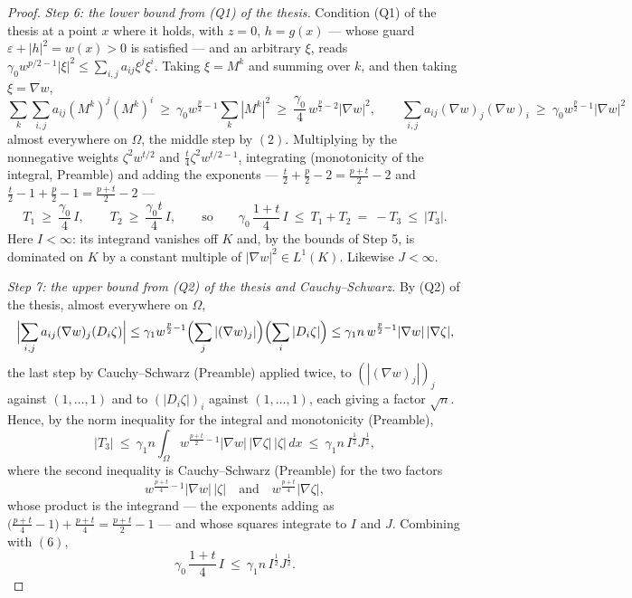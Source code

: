 \begin{proof}
\emph{Step 6: the lower bound from (Q1) of the thesis.}  Condition (Q1) of the thesis at a
point $x$ where it holds, with $z=0$, $h=g(x)$ --- whose guard
$\varepsilon+|h|^2=w(x)>0$ is satisfied --- and an arbitrary $\xi$, reads
$\gamma_0w^{p/2-1}|\xi|^2\le\sum_{i,j}a_{ij}\xi^j\xi^i$.  Taking $\xi=M^k$ and
summing over $k$, and then taking $\xi=\nabla w$,
\[
\sum_k\sum_{i,j}a_{ij}(M^k)^j(M^k)^i\ \ge\ \gamma_0w^{\frac p2-1}\sum_k|M^k|^2
\ \ge\ \frac{\gamma_0}4\,w^{\frac p2-2}|\nabla w|^2 ,
\qquad
\sum_{i,j}a_{ij}(\nabla w)_j(\nabla w)_i\ \ge\ \gamma_0w^{\frac p2-1}|\nabla w|^2
\]
almost everywhere on $\Omega$, the middle step by $(2)$.  Multiplying by the
nonnegative weights $\zeta^2w^{t/2}$ and $\tfrac t4\zeta^2w^{t/2-1}$,
integrating (monotonicity of the integral, Preamble) and adding the exponents
--- $\tfrac t2+\tfrac p2-2=\tfrac{p+t}2-2$ and
$\tfrac t2-1+\tfrac p2-1=\tfrac{p+t}2-2$ ---
\[
T_1\ \ge\ \frac{\gamma_0}4\,I,
\qquad
T_2\ \ge\ \frac{\gamma_0t}4\,I,
\qquad\text{so}\qquad
\gamma_0\,\frac{1+t}4\,I\ \le\ T_1+T_2\ =\ -T_3\ \le\ |T_3| .
\tag{6}
\]
Here $I<\infty$: its integrand vanishes off $K$ and, by the bounds of Step 5, is
dominated on $K$ by a constant multiple of $|\nabla w|^2\in L^1(K)$.  Likewise
$J<\infty$.

\emph{Step 7: the upper bound from (Q2) of the thesis and Cauchy--Schwarz.}  By
(Q2) of the thesis, almost everywhere on $\Omega$,
\[
\Bigl|\sum_{i,j}a_{ij}(\nabla w)_j(D_i\zeta)\Bigr|
\le\gamma_1w^{\frac p2-1}\Bigl(\sum_j|(\nabla w)_j|\Bigr)\Bigl(\sum_i|D_i\zeta|\Bigr)
\le\gamma_1n\,w^{\frac p2-1}|\nabla w|\,|\nabla\zeta| ,
\]
the last step by Cauchy--Schwarz (Preamble) applied twice, to
$(|(\nabla w)_j|)_j$ against $(1,\dots,1)$ and to $(|D_i\zeta|)_i$ against
$(1,\dots,1)$, each giving a factor $\sqrt n$.  Hence, by the norm inequality
for the integral and monotonicity (Preamble),
\[
|T_3|\ \le\ \gamma_1n\int_\Omega w^{\frac{p+t}2-1}|\nabla w|\,|\nabla\zeta|\,|\zeta|\,dx
\ \le\ \gamma_1n\,I^{\frac12}J^{\frac12},
\]
where the second inequality is Cauchy--Schwarz (Preamble) for the two factors
\[
w^{\frac{p+t}4-1}|\nabla w|\,|\zeta|
\quad\text{and}\quad
w^{\frac{p+t}4}|\nabla\zeta| ,
\]
whose product is the integrand --- the exponents adding as
$\bigl(\tfrac{p+t}4-1\bigr)+\tfrac{p+t}4=\tfrac{p+t}2-1$ --- and whose squares
integrate to $I$ and $J$.  Combining with $(6)$,
\[
\gamma_0\,\frac{1+t}4\,I\ \le\ \gamma_1n\,I^{\frac12}J^{\frac12}.
\tag{7}
\]


\end{proof}
